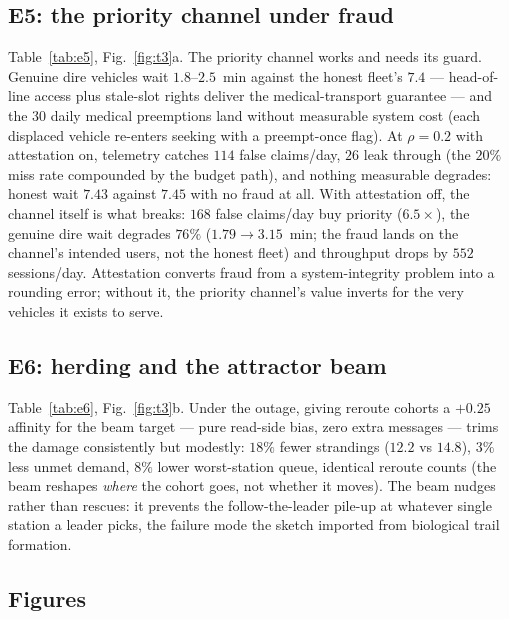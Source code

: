 \documentclass[twoside,twocolumn,usenatbib]{mnras}
\begin{document}




\subsection{E5: the priority channel under fraud}

Table~\ref{tab:e5}, Fig.~\ref{fig:t3}a.  The priority channel works
and needs its guard.  Genuine dire vehicles wait $1.8$--$2.5$~min
against the honest fleet's $7.4$ --- head-of-line access plus
stale-slot rights deliver the medical-transport guarantee --- and
the 30 daily medical preemptions land without measurable system
cost (each displaced vehicle re-enters seeking with a preempt-once
flag).  At $\rho=0.2$ with attestation on, telemetry catches $114$
false claims/day, $26$ leak through (the $20\%$ miss rate compounded
by the budget path), and nothing measurable degrades: honest wait
$7.43$ against $7.45$ with no fraud at all.  With attestation off,
the channel itself is what breaks: $168$ false claims/day buy
priority ($6.5\times$), the genuine dire wait degrades $76\%$
($1.79\to3.15$~min; the fraud lands on the channel's intended
users, not the honest fleet) and throughput drops by
$552$ sessions/day.  Attestation converts
fraud from a system-integrity problem into a rounding error;
without it, the priority channel's value inverts for the very
vehicles it exists to serve.



\subsection{E6: herding and the attractor beam}

Table~\ref{tab:e6}, Fig.~\ref{fig:t3}b.  Under the outage, giving
reroute cohorts a $+0.25$ affinity for the beam target --- pure
read-side bias, zero extra messages --- trims the damage consistently
but modestly: $18\%$ fewer strandings ($12.2$ vs $14.8$), $3\%$ less
unmet demand, $8\%$ lower worst-station queue, identical reroute
counts (the beam reshapes \emph{where} the cohort goes, not whether it
moves).  The beam nudges rather than rescues: it prevents the
follow-the-leader pile-up at whatever single station a leader picks,
the failure mode the sketch imported from biological
trail formation.



\subsection{Figures}
\end{document}
